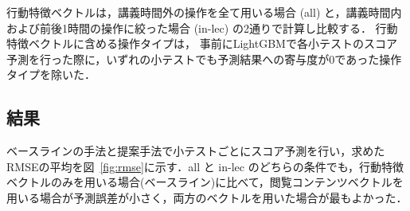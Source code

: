 \documentclass[platex,dvipdfmx,a4paper,twocolumn,base=10pt,jbase=10pt,ja=standard]{bxjsarticle}
\begin{document}
行動特徴ベクトルは，講義時間外の操作を全て用いる場合 (all) と，講義時間内および前後1時間の操作に絞った場合 (in-lec) の2通りで計算し比較する．
行動特徴ベクトルに含める操作タイプは，
事前にLightGBMで各小テストのスコア予測を行った際に，いずれの小テストでも予測結果への寄与度が0であった操作タイプを除いた．








\subsection{結果}

ベースラインの手法と提案手法で小テストごとにスコア予測を行い，求めたRMSEの平均を図~\ref{fig:rmse}に示す．all と in-lec のどちらの条件でも，行動特徴ベクトルのみを用いる場合(ベースライン)に比べて，閲覧コンテンツベクトルを用いる場合が予測誤差が小さく，両方のベクトルを用いた場合が最もよかった．
\end{document}
